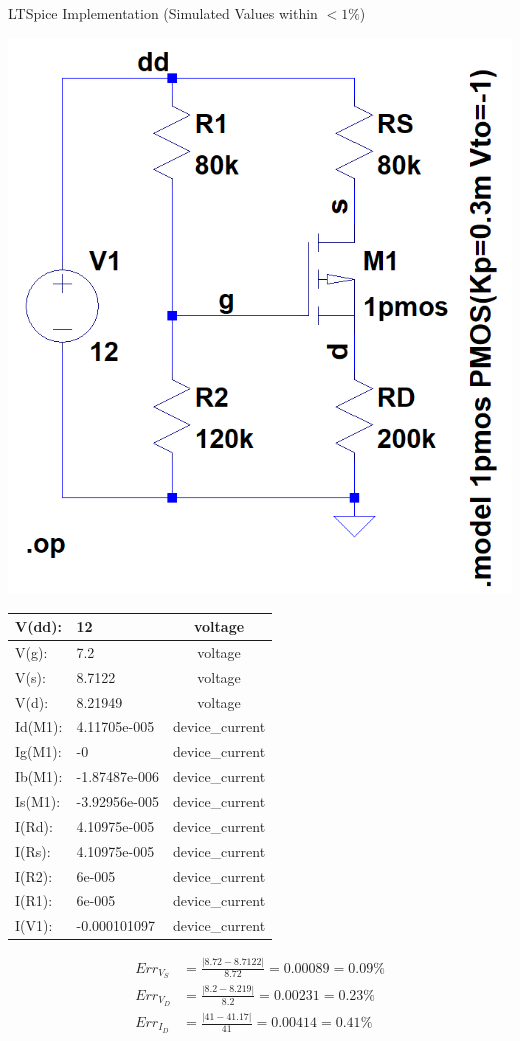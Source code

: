 \documentclass[12pt,letterpaper,titlepage]{article}
\begin{document}
\begin{raggedright}
\begin{center}
LTSpice Implementation (Simulated Values within $<1\%$)
\begin{paracol}{2}
\includegraphics[width=.48\textwidth, height=\textheight, keepaspectratio=true]{ds1b}
\switchcolumn
\begin{tabular}{|l|l|c|}
  \hline V(dd):	    & 12	        & voltage
\\\hline V(g):	    & 7.2	        & voltage
\\\hline V(s):	    & 8.7122	    & voltage
\\\hline V(d):	    & 8.21949	    & voltage
\\\hline Id(M1):	& 4.11705e-005	& device\_current
\\\hline Ig(M1):	& -0	        & device\_current
\\\hline Ib(M1):	& -1.87487e-006	& device\_current
\\\hline Is(M1):	& -3.92956e-005	& device\_current
\\\hline I(Rd):	    & 4.10975e-005	& device\_current
\\\hline I(Rs):	    & 4.10975e-005	& device\_current
\\\hline I(R2):	    & 6e-005	    & device\_current
\\\hline I(R1):	    & 6e-005	    & device\_current
\\\hline I(V1):	    & -0.000101097	& device\_current
\\\hline
\end{tabular}
\end{paracol}
\begin{align*}
   Err_{V_S} &= \frac{|8.72-8.7122|}{8.72} = 0.00089 = 0.09\%
\\ Err_{V_D} &= \frac{|8.2-8.219|}{8.2} = 0.00231 = 0.23\%
\\ Err_{I_D} &= \frac{|41-41.17|}{41} = 0.00414 = 0.41\%
\end{align*}
\end{center}


\end{raggedright}
\end{document}
